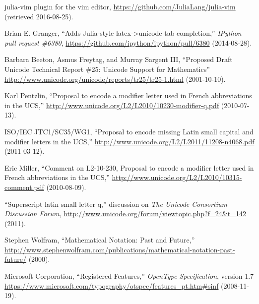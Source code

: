 \documentclass[10pt,english]{article}
\begin{document}
\begin{thebibliography}{10}
julia-vim plugin for the vim editor, \url{https://github.com/JuliaLang/julia-vim}
(retrieved 2016-08-25).

Brian E. Granger, ``Adds Julia-style
latex->unicode tab completion,'' \emph{IPython pull
request \#6380}, \url{https://github.com/ipython/ipython/pull/6380}
(2014-08-28).

Barbara Beeton, Asmus Freytag, and Murray Sargent
III, ``Proposed Draft Unicode Technical Report \#25:
Unicode Support for Mathematics'' \url{http://www.unicode.org/unicode/reports/tr25/tr25-1.html} (2001-10-10).

Karl Pentzlin, ``Proposal to encode
a modifier letter used in French abbreviations in the UCS,''
\url{http://www.unicode.org/L2/L2010/10230-modifier-q.pdf}
(2010-07-13).

ISO/IEC JTC1/SC35/WG1, ``Proposal
to encode missing Latin small capital and modifier letters in the
UCS,'' \url{http://www.unicode.org/L2/L2011/11208-n4068.pdf}
(2011-03-12).

Eric Miller, ``Comment on L2-10-230,
Proposal to encode a modifier letter used in French abbreviations
in the UCS,'' \url{http://www.unicode.org/L2/L2010/10315-comment.pdf}
(2010-08-09).

``Superscript latin small letter q,''
discussion on \emph{The Unicode Consortium Discussion Forum}, \url{http://www.unicode.org/forum/viewtopic.php?f=24&t=142}
(2011).

Stephen Wolfram, ``Mathematical
Notation: Past and Future,'' \url{http://www.stephenwolfram.com/publications/mathematical-notation-past-future/}
(2000).

Microsoft Corporation, ``Registered
Features,'' \emph{OpenType Specification}, version
1.7 \url{https://www.microsoft.com/typography/otspec/features_pt.htm\#sinf}
(2008-11-19). \end{thebibliography}
\end{document}
